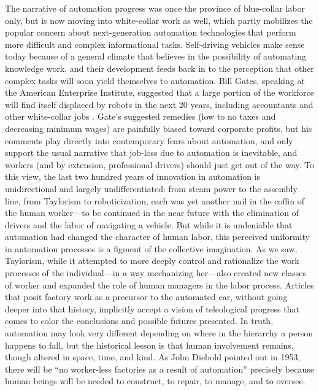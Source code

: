 The narrative of automation progress was once the province of
blue-collar labor only, but is now moving into white-collar work as
well, which partly mobilizes the popular concern about next-generation
automation technologies that perform more difficult and complex
informational tasks. Self-driving vehicles make sense today because of
a general climate that believes in the possibility of automating
knowledge work, and their development feeds back in to the perception
that other complex tasks will soon yield themselves to automation. Bill
Gates, speaking at the American Enterprise Institute,
suggested that a large portion of the workforce will find itself
displaced by robots in the next 20 years, including accountants and
other white-collar
jobs \cite{gatesRobots}.
Gate's suggested remedies (low to no taxes and decreasing minimum
wages) are painfully biased toward corporate profits, but his comments play directly into
contemporary fears about automation, and only support the usual
narrative that job-loss due to automation is inevitable, and workers
(and by extension, professional drivers)
should just get out of the way. To this view, the last two hundred
years of innovation in automation is unidirectional and largely
undifferentiated:  from steam power to the assembly line, from
Taylorism to roboticization, each was yet another nail in the coffin
of the human worker---to be continued in the near future with the
elimination of drivers and the labor of navigating a vehicle. But
while it is undeniable that automation had changed the
character of human labor, this perceived uniformity in automation
processes is a figment of the collective imagination. As we saw,
Taylorism, while it attempted to more deeply control and rationalize
the work processes of the individual---in a way mechanizing her---also
created new classes of worker and expanded the role of human managers
in the labor process. Articles that posit factory work as a precursor to the automated
car, without going deeper into that history, implicitly accept a
vision of teleological progress that comes to color the conclusions
and possible futures presented. In truth, automation may look very
different depending on where in the hierarchy 
a person happens to fall, but the historical lesson is that human
involvement remains, though altered in space, time, and kind. As John
Diebold pointed out in 1953, there will be ``no worker-less
factories as a result of automation'' \cite[p. 63-64]{dieboldNew}
precisely because human beings will be needed to construct, to repair,
to manage, and to oversee.

